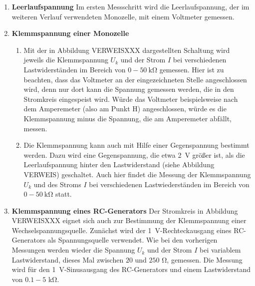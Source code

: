 \begin{enumerate}
\item \textbf{Leerlaufspannung} Im ersten Messschritt wird die Leerlaufspannung, der im weiteren Verlauf verwendeten Monozelle, mit einem Voltmeter gemessen.
\item \textbf{Klemmspannung einer Monozelle}
\begin{enumerate}[label=\alph*)]
	\item Mit der in Abbildung VERWEISXXX dargestellten Schaltung wird jeweils die Klemmspannung $U_k$ und der Strom $I$ bei verschiedenen Lastwiderständen im Bereich von $0-50\ \si{\kilo\ohm}$ gemessen. Hier ist zu beachten, dass das Voltmeter an der eingezeichneten Stelle angeschlossen wird, denn nur dort kann die Spannung gemessen werden, die in den Stromkreis eingespeist wird. Würde das Voltmeter beispielsweise nach dem Amperemeter (also am Punkt H) angeschlossen, würde es die Klemmspannung minus die Spannung, die am Amperemeter abfällt, messen.
	\item Die Klemmspannung kann auch mit Hilfe einer Gegenspannung bestimmt werden. Dazu wird eine Gegenspannung, die etwa \SI{2}{\volt} größer ist, als die Leerlaufspannung hinter den Lastwiderstand (siehe Abbildung VERWEIS) geschaltet. Auch hier findet die Messung der Klemmspannung $U_k$ und des Stroms $I$ bei verschiedenen Lastwiederständen im Bereich von $0-50\ \si{\kilo\ohm}$ statt.
\end{enumerate}
\item \textbf{Klemmspannung eines RC-Generators} Der Stromkreis in Abbildung VERWEISXXX eignet sich auch zur Bestimmung der Klemmspannung einer Wechselspannungsquelle. Zunächst wird der \SI{1}{\volt}-Rechteckausgang eines RC-Generators als Spannungsquelle verwendet. Wie bei den vorherigen Messungen werden wieder die Spannung $U_k$ und der Strom $I$ bei variablem Lastwiderstand, dieses Mal zwischen $20$ und $250$ \si{\ohm}, gemessen. Die Messung wird für den \SI{1}{\volt}-Sinusausgang des RC-Generators und einem Lastwiderstand von $0.1-5$ \si{\kilo\ohm}.
\end{enumerate}
